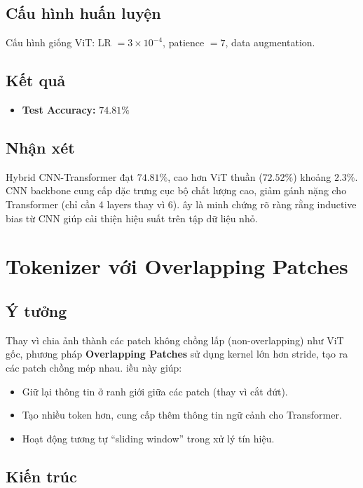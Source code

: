 \documentclass[a4paper]{article}
\theoremstyle{definition}
\begin{document}
\subsection{Cấu hình huấn luyện}
Cấu hình giống ViT: LR $= 3 \times 10^{-4}$, patience $= 7$, data augmentation.

\subsection{Kết quả}
\begin{itemize}
	\item \textbf{Test Accuracy:} $\mathbf{74.81\%}$
\end{itemize}

\subsection{Nhận xét}
Hybrid CNN-Transformer đạt $74.81\%$, cao hơn ViT thuần ($72.52\%$) khoảng $2.3\%$. CNN backbone cung cấp đặc trưng cục bộ chất lượng cao, giảm gánh nặng cho Transformer (chỉ cần 4 layers thay vì 6). \DJ ây là minh chứng rõ ràng rằng inductive bias từ CNN giúp cải thiện hiệu suất trên tập dữ liệu nhỏ.

\section{Tokenizer với Overlapping Patches}

\subsection{Ý tưởng}
Thay vì chia ảnh thành các patch không chồng lấp (non-overlapping) như ViT gốc, phương pháp \textbf{Overlapping Patches} sử dụng kernel lớn hơn stride, tạo ra các patch chồng mép nhau. \DJ iều này giúp:
\begin{itemize}
	\item Giữ lại thông tin ở ranh giới giữa các patch (thay vì cắt đứt).
	\item Tạo nhiều token hơn, cung cấp thêm thông tin ngữ cảnh cho Transformer.
	\item Hoạt động tương tự ``sliding window'' trong xử lý tín hiệu.
\end{itemize}

\subsection{Kiến trúc}
\end{document}
